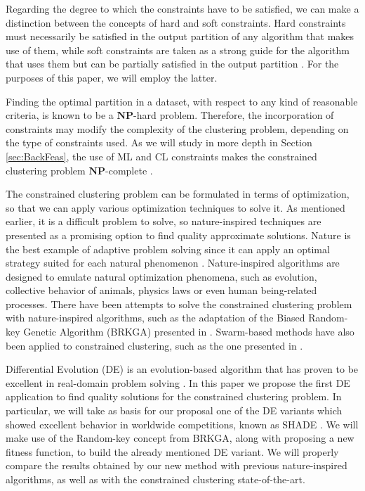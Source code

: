 \documentclass[review]{elsarticle}
\begin{document}
Regarding the degree to which the constraints have to be satisfied, we can make a distinction between the concepts of hard \cite{wagstaff2001constrained} and soft \cite{law2004clustering} constraints. Hard constraints must necessarily be satisfied in the output partition of any algorithm that makes use of them, while soft constraints are taken as a strong guide for the algorithm that uses them but can be partially satisfied in the output partition \cite{seret2014new}. For the purposes of this paper, we will employ the latter.

Finding the optimal partition in a dataset, with respect to any kind of reasonable criteria, is known to be a $\mathbf{NP}$-hard problem. Therefore, the incorporation of constraints may modify the complexity of the clustering problem, depending on the type of constraints used. As we will study in more depth in Section \ref{sec:BackFeas}, the use of ML and CL constraints makes the constrained clustering problem $\mathbf{NP}$-complete \cite{davidson2005clustering}.

The constrained clustering problem can be formulated in terms of optimization, so that we can apply various optimization techniques to solve it. As mentioned earlier, it is a difficult problem to solve, so nature-inspired techniques are presented as a promising option to find quality approximate solutions. Nature is the best example of adaptive problem solving since it can apply an optimal strategy suited for each natural phenomenon \cite{fausto2019ants}. Nature-inspired algorithms are designed to emulate natural optimization phenomena, such as evolution, collective behavior of animals, physics laws or even human being-related processes. There have been attempts to solve the constrained clustering problem with nature-inspired algorithms, such as the adaptation of the Biased Random-key Genetic Algorithm (BRKGA) presented in \cite{de2017comparison}. Swarm-based methods have also been applied to constrained clustering, such as the one presented in \cite{xu2013improving}.

Differential Evolution (DE) is an evolution-based algorithm that has proven to be excellent in real-domain problem solving \cite{das2011differential}. In this paper we propose the first DE application to find quality solutions for the constrained clustering problem. In particular, we will take as basis for our proposal one of the DE variants which showed excellent behavior in worldwide competitions, known as SHADE \cite{molina2018insight}. We will make use of the Random-key concept from BRKGA, along with proposing a new fitness function, to build the already mentioned DE variant. We will properly compare the results obtained by our new method with previous nature-inspired algorithms, as well as with the constrained clustering state-of-the-art.
\end{document}
